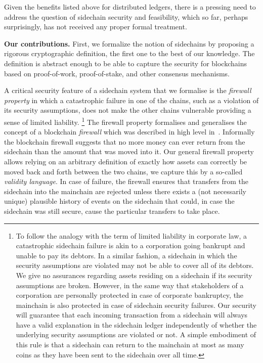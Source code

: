 Given the benefits listed above for distributed ledgers, there is a pressing
need to address the question of sidechain security and feasibility, which so far, perhaps surprisingly, has not received any proper formal treatment.

\medskip

\noindent
{\bf Our contributions. }
First, we formalize the notion of sidechains by proposing a rigorous cryptographic
definition, the first one to the best of our knowledge.
The definition is abstract enough to be able to capture the security for
blockchains based on proof-of-work, proof-of-stake, and other consensus mechanisms.

A critical security feature of a  sidechain system that we formalise
is the \textit{firewall property} in
which a catastrophic failure in one of the chains, such as a violation of its
security assumptions, does not make the other chains vulnerable providing a
sense of limited liability.%
\footnote{To follow the analogy with the term of limited liability in corporate
law, a catastrophic sidechain failure is akin to a corporation going bankrupt
and unable to pay its debtors. In a similar fashion, a sidechain in which the
security assumptions are violated may not be able to cover all of its debtors.
We give no assurances regarding assets residing on a sidechain if its
security assumptions are broken.
 However, in the same way that stakeholders of a corporation are personally
protected in case of corporate bankruptcy, the mainchain is also protected in
case of sidechain security failures. Our security will guarantee that
each incoming transaction from a sidechain will always have a valid
explanation  in the sidechain ledger
independently of whether the underlying
security assumptions are violated or not. A simple embodiment of this rule
is that a sidechain can return to the mainchain at most as many coins as they have been sent to the sidechain over all time.
}
The   firewall property formalises and generalises the concept of a blockchain \textit{firewall} which was described in high level in~\cite{sidechains}. Informally the blockchain firewall suggests
that no more money can ever return from the sidechain than the amount that was moved
into it. Our general firewall property  allows relying on an
arbitrary definition of exactly how assets can correctly be moved back and forth
between the two chains, we capture this by a so-called
\textit{validity language}. In case of failure, the firewall
ensures that transfers from the sidechain into the mainchain are rejected unless
there exists a (not necessarily unique) plausible history of events on the sidechain that could, in case the
sidechain was still secure, cause the particular transfers to take place.

